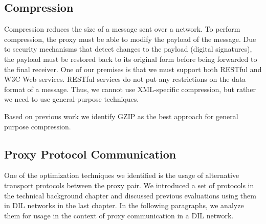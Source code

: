 \subsection{Compression}

Compression reduces the size of a message sent over a network. To perform
compression, the proxy must be able to modify the payload of the message. Due to
security mechanisms that detect changes to the payload (digital signatures), the
payload must be restored back to its original form before being forwarded to the
final receiver. One of our premises is that we must support both RESTful and W3C
Web services. RESTful services do not put any restrictions on the data format of
a message. Thus, we cannot use XML-specific compression, but rather we need to
use general-purpose techniques.

Based on previous work we identify GZIP as the best approach for general
purpose compression.

\subsection{Proxy Protocol Communication}

One of the optimization techniques we identified is the usage of alternative
transport protocols between the proxy pair. We introduced a set of protocols in
the technical background chapter and discussed previous evaluations using them
in DIL networks in the last chapter. In the following paragraphs, we analyze
them for usage in the context of proxy communication in a DIL network.

